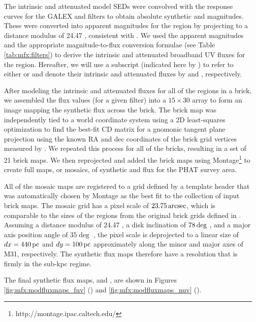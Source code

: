 \documentclass[iop, tighten]{emulateapj}
\begin{document}
The intrinsic and attenuated model SEDs were convolved with the response curves
for the GALEX \fuv{} and \nuv{} filters to obtain absolute synthetic \fuv{} and
\nuv{} magnitudes. These were converted into apparent magnitudes for the region
by projecting to a distance modulus of 24.47 \citep{McConnachie:2005},
consistent with \citet{Lewis:2014}. We used the apparent magnitudes and the
appropriate magnitude-to-flux conversion formulae (see Table
\ref{tab:mfx:filters}) to derive the intrinsic and attenuated broadband UV
fluxes for the region. Hereafter, we will use a subscript (indicated here by
\filter{}) to refer to either \fuv{} or \nuv{} and denote their intrinsic and
attenuated fluxes by \fxsfhz{} and \fxsfh{}, respectively.

After modeling the intrinsic and attenuated fluxes for all of the regions in a
brick, we assembled the flux values (for a given filter) into a $15 \times 30$
array to form an image mapping the synthetic flux across the brick. The brick
map was independently tied to a world coordinate system using a 2D
least-squares optimization to find the best-fit CD matrix
\citep{Calabretta:2002} for a gnomonic tangent plane projection using the known
RA and dec coordinates of the brick grid vertices measured by
\citet{Lewis:2014}. We repeated this process for all of the \citet{Lewis:2014}
bricks, resulting in a set of 21 brick maps. We then reprojected and added the
brick maps using Montage\footnote{http://montage.ipac.caltech.edu/} to create
full maps, or mosaics, of synthetic \fuv{} and \nuv{} flux for the PHAT survey
area.

All of the mosaic maps are registered to a grid defined by a template header
that was automatically chosen by Montage as the best fit to the collection of
input brick maps. The mosaic grid has a pixel scale of $23.75\,\mathrm{arcsec}$, which
is comparable to the sizes of the regions from the original brick grids defined
in \citet{Lewis:2014}. Assuming a distance modulus of 24.47
\citep{McConnachie:2005}, a disk inclination of $78\,\mathrm{deg}$ \citep{Tully:1994},
and a major axis position angle of $35\deg$ \citep{deVaucouleurs:1995}, the
pixel scale is deprojected to a linear size of $dx = 440\,\mathrm{pc}$ and $dy = 100\,\mathrm{pc}$
approximately along the minor and major axes of M31, respectively. The
synthetic flux maps therefore have a resolution that is firmly in the sub-kpc
regime.

The final synthetic flux maps, \fxsfhz{} and \fxsfh{}, are shown in Figures
\ref{fig:mfx:modfluxmaps_fuv} (\fuv{}) and \ref{fig:mfx:modfluxmaps_nuv}
(\nuv{}).
\end{document}
